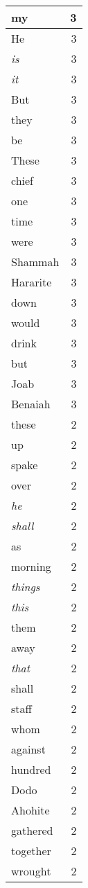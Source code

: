 \begin{center}
\begin{longtable}{l|r}
my & 3 \\ \hline
He & 3 \\ \hline
\emph{is} & 3 \\ \hline
\emph{it} & 3 \\ \hline
But & 3 \\ \hline
they & 3 \\ \hline
be & 3 \\ \hline
These & 3 \\ \hline
chief & 3 \\ \hline
one & 3 \\ \hline
time & 3 \\ \hline
were & 3 \\ \hline
Shammah & 3 \\ \hline
Hararite & 3 \\ \hline
down & 3 \\ \hline
would & 3 \\ \hline
drink & 3 \\ \hline
but & 3 \\ \hline
Joab & 3 \\ \hline
Benaiah & 3 \\ \hline
these & 2 \\ \hline
up & 2 \\ \hline
spake & 2 \\ \hline
over & 2 \\ \hline
\emph{he} & 2 \\ \hline
\emph{shall} & 2 \\ \hline
as & 2 \\ \hline
morning & 2 \\ \hline
\emph{things} & 2 \\ \hline
\emph{this} & 2 \\ \hline
them & 2 \\ \hline
away & 2 \\ \hline
\emph{that} & 2 \\ \hline
shall & 2 \\ \hline
staff & 2 \\ \hline
whom & 2 \\ \hline
against & 2 \\ \hline
hundred & 2 \\ \hline
Dodo & 2 \\ \hline
Ahohite & 2 \\ \hline
gathered & 2 \\ \hline
together & 2 \\ \hline
wrought & 2 \\ \hline

\end{longtable}
\end{center}

